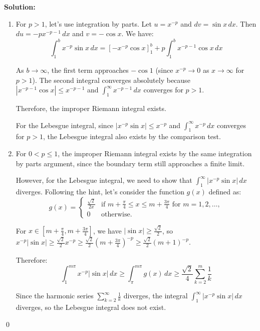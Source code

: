\noindent\textbf{Solution:}
\begin{enumerate}[label=(\alph*)]
    \item For $p > 1$, let's use integration by parts. Let $u = x^{-p}$ and $dv = \sin x \, dx$. Then $du = -px^{-p-1} \, dx$ and $v = -\cos x$. We have:
    \[\int_1^b x^{-p} \sin x \, dx = \left[-x^{-p} \cos x\right]_1^b + p \int_1^b x^{-p-1} \cos x \, dx\]
    
    As $b \to \infty$, the first term approaches $-\cos 1$ (since $x^{-p} \to 0$ as $x \to \infty$ for $p > 1$). The second integral converges absolutely because $|x^{-p-1} \cos x| \leq x^{-p-1}$ and $\int_1^\infty x^{-p-1} \, dx$ converges for $p > 1$.
    
    Therefore, the improper Riemann integral exists.
    
    For the Lebesgue integral, since $|x^{-p} \sin x| \leq x^{-p}$ and $\int_1^\infty x^{-p} \, dx$ converges for $p > 1$, the Lebesgue integral also exists by the comparison test.
    
    \item For $0 < p \leq 1$, the improper Riemann integral exists by the same integration by parts argument, since the boundary term still approaches a finite limit.
    
    However, for the Lebesgue integral, we need to show that $\int_1^\infty |x^{-p} \sin x| \, dx$ diverges. Following the hint, let's consider the function $g(x)$ defined as:
    \[g(x) = 
    \begin{cases} 
    \frac{\sqrt{2}}{2x} & \text{if } m + \frac{\pi}{4} \leq x \leq m + \frac{3\pi}{4} \text{ for } m = 1, 2, \ldots, \\ 
    0 & \text{otherwise}.
    \end{cases}\]
    
    For $x \in [m + \frac{\pi}{4}, m + \frac{3\pi}{4}]$, we have $|\sin x| \geq \frac{\sqrt{2}}{2}$, so $x^{-p} |\sin x| \geq \frac{\sqrt{2}}{2} x^{-p} \geq \frac{\sqrt{2}}{2} (m + \frac{3\pi}{4})^{-p} \geq \frac{\sqrt{2}}{2} (m + 1)^{-p}$.
    
    Therefore:
    \[\int_{1}^{m\pi} x^{-p} |\sin x| \, dx \geq \int_{\pi}^{m\pi} g(x) \, dx \geq \frac{\sqrt{2}}{4} \sum_{k=2}^{m} \frac{1}{k}\]
    
    Since the harmonic series $\sum_{k=2}^{\infty} \frac{1}{k}$ diverges, the integral $\int_1^\infty |x^{-p} \sin x| \, dx$ diverges, so the Lebesgue integral does not exist.
\end{enumerate}\qed


